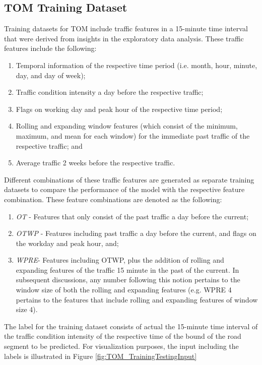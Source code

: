 \subsection{TOM Training Dataset}
Training datasets for TOM include traffic features in a 15-minute time interval that were derived from insights in the exploratory data analysis. These traffic features include the following:
 \begin{enumerate}
\item Temporal information of the respective time period (i.e. month, hour, minute, day, and day of week);
\item Traffic condition intensity a day before the respective traffic;
\item Flags on working day and peak hour of the respective time period;
\item Rolling and expanding window features (which consist of the minimum, maximum, and mean for each window) for the immediate past traffic of the respective traffic; and
\item Average traffic 2 weeks before the respective traffic.
\end{enumerate}

Different combinations of these traffic features are generated as separate training datasets to compare the performance of the model with the respective feature combination. These feature combinations are denoted as the following: 

\begin{enumerate}
\item \textit{OT} - Features that only consist of the past traffic a day before the current;
\item \textit{OTWP} - Features including past traffic a day before the current, and flags on the workday and peak hour, and;
\item \textit{WPRE}- Features including OTWP, plus the addition of rolling and expanding features of the traffic 15 minute in the past of the current. In subsequent discussions, any number following this notion pertains to the window size of both the rolling and expanding features (e.g. WPRE 4 pertains to the features that include rolling and expanding features of window size 4).
\end{enumerate}

The label for the training dataset consists of actual the 15-minute time interval of the traffic condition intensity of the respective time of the bound of the road segment to be predicted. For visualization purposes, the input including the labels is illustrated in Figure \ref{fig:TOM_TrainingTestingInput}


